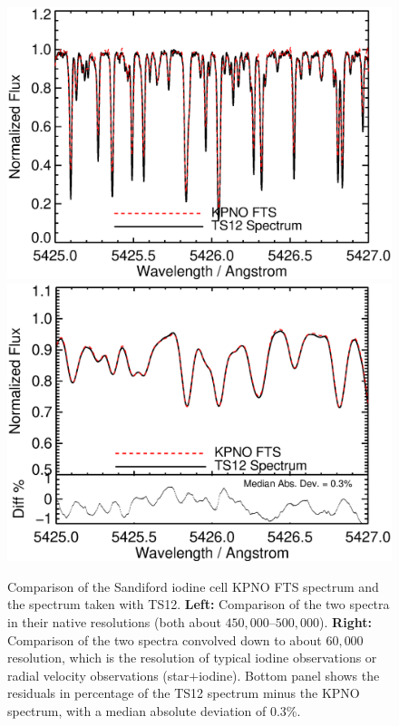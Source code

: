 \begin{figure}[!th]
\includegraphics[angle=0.,scale=0.38]{het/chunk_5425A_original_sclrem.eps}
\includegraphics[angle=0.,scale=0.38]{het/chunk_5425A_60k_gaus_sclrem_diff.eps}
\caption{Comparison of the Sandiford iodine cell KPNO FTS spectrum and
  the spectrum taken with TS12. \textbf{Left:} Comparison of the two
  spectra in their native resolutions (both about
  $450,000$--$500,000$). \textbf{Right:} Comparison of the two spectra
  convolved down to about $60,000$ resolution, which is the resolution
  of typical iodine observations or radial velocity observations
  (star$+$iodine). Bottom panel shows the residuals in percentage of
  the TS12 spectrum minus the KPNO spectrum, with a median absolute
  deviation of 0.3\%.
  \label{fig:ts12}}
\end{figure}

